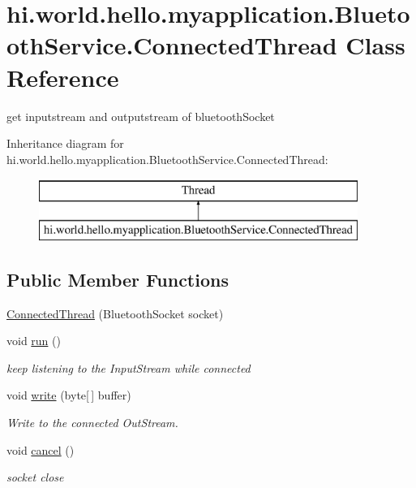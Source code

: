 \hypertarget{classhi_1_1world_1_1hello_1_1myapplication_1_1_bluetooth_service_1_1_connected_thread}{}\section{hi.\+world.\+hello.\+myapplication.\+Bluetooth\+Service.\+Connected\+Thread Class Reference}
\label{classhi_1_1world_1_1hello_1_1myapplication_1_1_bluetooth_service_1_1_connected_thread}


get inputstream and outputstream of bluetooth\+Socket  


Inheritance diagram for hi.\+world.\+hello.\+myapplication.\+Bluetooth\+Service.\+Connected\+Thread\+:\begin{figure}[H]
\begin{center}
\leavevmode
\includegraphics[height=2.000000cm]{classhi_1_1world_1_1hello_1_1myapplication_1_1_bluetooth_service_1_1_connected_thread}
\end{center}
\end{figure}
\subsection*{Public Member Functions}
\begin{DoxyCompactItemize}
\item 
\mbox{\hyperlink{classhi_1_1world_1_1hello_1_1myapplication_1_1_bluetooth_service_1_1_connected_thread_a124e4a4d8a085506222d036222f8c7ad}{Connected\+Thread}} (Bluetooth\+Socket socket)
\item 
void \mbox{\hyperlink{classhi_1_1world_1_1hello_1_1myapplication_1_1_bluetooth_service_1_1_connected_thread_acacda19ed76e1ff90fe486138931af2e}{run}} ()
\begin{DoxyCompactList}\small\item\em keep listening to the Input\+Stream while connected \end{DoxyCompactList}\item 
void \mbox{\hyperlink{classhi_1_1world_1_1hello_1_1myapplication_1_1_bluetooth_service_1_1_connected_thread_af88ff7e7f927c756e5dc964bcd742ad9}{write}} (byte\mbox{[}$\,$\mbox{]} buffer)
\begin{DoxyCompactList}\small\item\em Write to the connected Out\+Stream. \end{DoxyCompactList}\item 
void \mbox{\hyperlink{classhi_1_1world_1_1hello_1_1myapplication_1_1_bluetooth_service_1_1_connected_thread_ad8e36ab019ad87167993ee39a2ca0797}{cancel}} ()
\begin{DoxyCompactList}\small\item\em socket close \end{DoxyCompactList}\end{DoxyCompactItemize}
